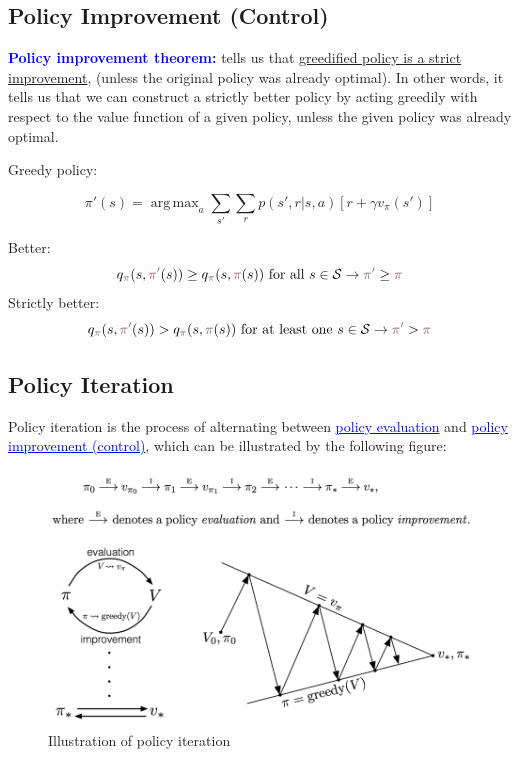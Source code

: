 \documentclass[12pt, a4paper]{article}
\DeclareMathOperator*{\argmax}{arg\,max} %
\begin{document}
\subsection{Policy Improvement (Control)}\label{policy-improvement-control}

\textbf{\textcolor{blue}{Policy improvement theorem:}} tells us that \uline{greedified policy is a strict improvement}, (unless the original policy was already optimal). In other words, it tells us that we can construct a strictly better policy by acting greedily with respect to the value function of a given policy, unless the given policy was already optimal.

Greedy policy:

$$
\pi'(s) =  \argmax_a \sum_{s'} \sum_r p(s',r | s,a)[r + \gamma v_\pi(s')]
$$


Better:
$$
q_{\textcolor[HTML]{8F5760}{\pi}}(s,\textcolor[HTML]{8F5760}{\pi'}(s)) \geq  q_{\textcolor[HTML]{8F5760}{\pi}}(s,\textcolor[HTML]{8F5760}{\pi}(s)) \text{ for all } s \in \mathcal{S} \rightarrow \textcolor[HTML]{8F5760}{\pi'} \geq \textcolor[HTML]{8F5760}{\pi}
$$
Strictly better:
$$
q_{\textcolor[HTML]{8F5760}{\pi}}(s,\textcolor[HTML]{8F5760}{\pi'}(s)) >  q_{\textcolor[HTML]{8F5760}{\pi}}(s,\textcolor[HTML]{8F5760}{\pi}(s)) \text{ for at least one } s \in \mathcal{S} \rightarrow \textcolor[HTML]{8F5760}{\pi'} > \textcolor[HTML]{8F5760}{\pi}
$$





\subsection{Policy Iteration}\label{policy-iteration}


Policy iteration is the process of alternating between \textcolor{blue}{\uline{policy evaluation}} and \textcolor{blue}{\uline{policy improvement (control)}}, which can be illustrated by the following figure:


\begin{figure}[H]
  \centering  %
    \includegraphics[width=0.9\columnwidth]{images/policy-iteration.png}
    \caption{Illustration of policy iteration}
    \label{fig:policy-iteration}
\end{figure}
\end{document}
